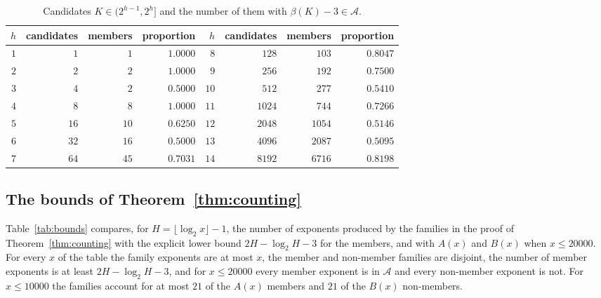 \documentclass[11pt]{amsart}
\theoremstyle{definition}
\begin{document}
\begin{table}[H]
\centering
\caption{Candidates $K\in(2^{h-1},2^h]$ and the number of them with $\beta(K)-3\in\mathcal{A}$.}
\label{tab:blocks}
\begin{tabular}{rrrr@{\qquad}rrrr}
\toprule
$h$ & candidates & members & proportion & $h$ & candidates & members & proportion\\
\midrule
$1$ & $1$ & $1$ & $1.0000$ & $8$ & $128$ & $103$ & $0.8047$\\
$2$ & $2$ & $2$ & $1.0000$ & $9$ & $256$ & $192$ & $0.7500$\\
$3$ & $4$ & $2$ & $0.5000$ & $10$ & $512$ & $277$ & $0.5410$\\
$4$ & $8$ & $8$ & $1.0000$ & $11$ & $1024$ & $744$ & $0.7266$\\
$5$ & $16$ & $10$ & $0.6250$ & $12$ & $2048$ & $1054$ & $0.5146$\\
$6$ & $32$ & $16$ & $0.5000$ & $13$ & $4096$ & $2087$ & $0.5095$\\
$7$ & $64$ & $45$ & $0.7031$ & $14$ & $8192$ & $6716$ & $0.8198$\\
\bottomrule
\end{tabular}
\end{table}

\subsection{The bounds of Theorem~\ref{thm:counting}}
\label{subsec:bounds-exp}
Table~\ref{tab:bounds} compares, for $H=\lfloor\log_2x\rfloor-1$, the number of exponents produced by the families in the proof of Theorem~\ref{thm:counting} with the explicit lower bound $2H-\log_2H-3$ for the members, and with $A(x)$ and $B(x)$ when $x\le20000$. For every $x$ of the table the family exponents are at most $x$, the member and non-member families are disjoint, the number of member exponents is at least $2H-\log_2H-3$, and for $x\le20000$ every member exponent is in $\mathcal{A}$ and every non-member exponent is not. For $x\le10000$ the families account for at most $21$ of the $A(x)$ members and $21$ of the $B(x)$ non-members.
\end{document}
